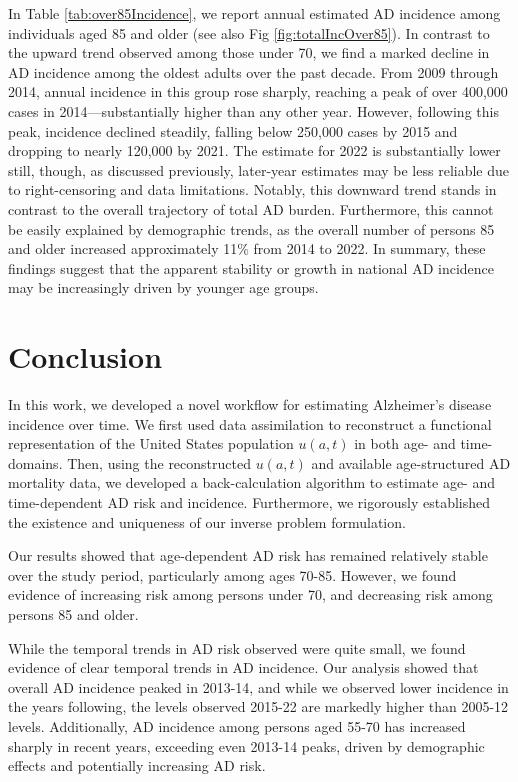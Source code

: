 \documentclass{article}
\begin{document}
In Table \ref{tab:over85Incidence}, we report annual estimated AD incidence among individuals aged 85 and older (see also Fig \ref{fig:totalIncOver85}). In contrast to the upward trend observed among those under 70, we find a marked decline in AD incidence among the oldest adults over the past decade. From 2009 through 2014, annual incidence in this group rose sharply, reaching a peak of over 400,000 cases in 2014—substantially higher than any other year. However, following this peak, incidence declined steadily, falling below 250,000 cases by 2015 and dropping to nearly 120,000 by 2021. The estimate for 2022 is substantially lower still, though, as discussed previously, later-year estimates may be less reliable due to right-censoring and data limitations. Notably, this downward trend stands in contrast to the overall trajectory of total AD burden. Furthermore, this cannot be easily explained by demographic trends, as the overall number of persons 85 and older increased approximately 11\% from 2014 to 2022. In summary, these findings suggest that the apparent stability or growth in national AD incidence may be increasingly driven by younger age groups.


\section{Conclusion}\label{sec:conclusions}
In this work, we developed a novel workflow for estimating Alzheimer's disease incidence over time. We first used data assimilation to reconstruct a functional representation of the United States population $u(a,t)$ in both age- and time-domains. Then, using the reconstructed $u(a,t)$ and available age-structured AD mortality data, we developed a back-calculation algorithm to estimate age- and time-dependent AD risk and incidence. Furthermore, we rigorously established the existence and uniqueness of our inverse problem formulation.

\par Our results showed that age-dependent AD risk has remained relatively stable over the study period, particularly among ages 70-85. However, we found evidence of increasing risk among persons under 70, and decreasing risk among persons 85 and older. 

\par While the temporal trends in AD risk observed were quite small, we found evidence of clear temporal trends in AD incidence. Our analysis showed that overall AD incidence peaked in 2013-14, and while we observed lower incidence in the years following, the levels observed 2015-22 are markedly higher than 2005-12 levels. Additionally, AD incidence among persons aged 55-70 has increased sharply in recent years, exceeding even 2013-14 peaks, driven by demographic effects and potentially increasing AD risk.
\end{document}
